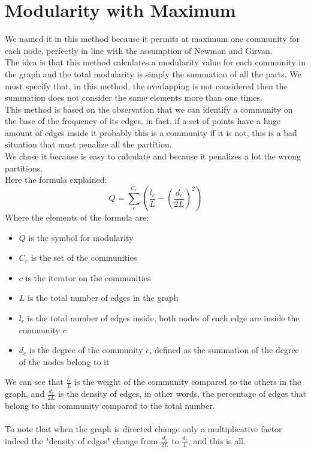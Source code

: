 \documentclass[epsfig,a4paper,11pt,titlepage,twoside,openany]{book}
\begin{document}
\section{Modularity with Maximum}
We named it in this method because it permits at maximum one community for each node, perfectly in line with the assumption of Newman and Girvan.\\
The idea is that this method calculates a modularity value for each community in the graph and the total modularity is simply the summation of all the parts. We must specify that, in this method, the overlapping is not considered then the summation does not consider the same elements more than one times.\\
This method is based on the observation that we can identify a community on the base of the frequency of its edges, in fact, if a set of points have a huge amount of edges inside it probably this is a community if it is not, this is a bad situation that must penalize all the partition.\\
We chose it because is easy to calculate and because it penalizes a lot the wrong partitions.\\
Here the formula explained:
\begin{equation}
	Q=\sum_{c}^{C_r} \left( \frac{l_c}{L}-\left(\frac{d_c}{2L} \right)^2 \right)
	\label{eq:m_max}
\end{equation}
Where the elements of the formula are:
\begin{itemize}
	\item $Q$ is the symbol for modularity
	\item $C_r$ is the set of the communities
	\item $c$ is the iterator on the communities
	\item $L$ is the total number of edges in the graph
	\item $l_c$ is the total number of edges inside, both nodes of each edge are inside the community $c$
	\item $d_c$ is the degree of the community $c$, defined as the summation of the degree of the nodes belong to it
\end{itemize}
We can see that $\displaystyle\frac{l_c}{L}$ is the weight of the community compared to the others in the graph, and $\displaystyle\frac{d_c}{2L}$ is the density of edges, in other words, the percentage of edges that belong to this community compared to the total number.\\
\\
To note that when the graph is directed change only a multiplicative factor indeed the "density of edges" change from $\displaystyle\frac{d_c}{2L}$ to $\displaystyle\frac{d_c}{L}$, and this is all.
%
%
\end{document}
